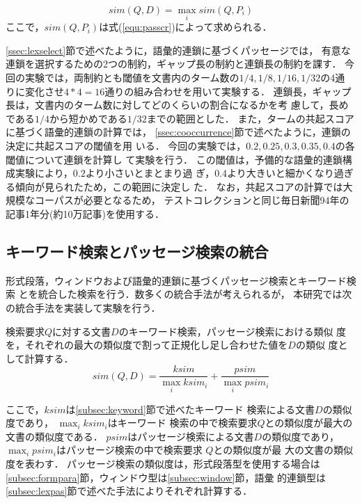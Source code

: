 \begin{equation}\label{equ:maxpas}
sim(Q,D)=\max_{i}sim(Q,P_{i})
\end{equation}
\noindent ここで，$sim(Q,P_{i})$は式(\ref{equ:passcr})によって求められる．

\ref{ssec:lexselect}節で述べたように，語彙的連鎖に基づくパッセージでは，
有意な連鎖を選択するための2つの制約，ギャップ長の制約と連鎖長の制約を課す．
今回の実験では，両制約とも閾値を文書内のターム数の$1/4,1/8,1/16,1/32$の4通
りに変化させ$4*4=16$通りの組み合わせを用いて実験する．
連鎖長，ギャップ長は，文書内のターム数に対してどのくらいの割合になるかを考
慮して，長めである$1/4$から短かめである$1/32$までの範囲とした．
また，タームの共起スコアに基づく語彙的連鎖の計算では，
\ref{ssec:cooccurrence}節で述べたように，連鎖の決定に共起スコアの閾値を用
いる．
今回の実験では，$0.2,0.25,0.3,0.35,0.4$の各閾値について連鎖を計算し
て実験を行う．
この閾値は，予備的な語彙的連鎖構成実験により，$0.2$より小さいとまとまり過
ぎ，$0.4$より大きいと細かくなり過ぎる傾向が見られたため，この範囲に決定し
た．
なお，共起スコアの計算では大規模なコーパスが必要となるため，
テストコレクションと同じ毎日新聞94年の記事1年分(約10万記事)を使用する．

\subsection{キーワード検索とパッセージ検索の統合}
形式段落，ウィンドウおよび語彙的連鎖に基づくパッセージ検索とキーワード検索
とを統合した検索を行う．数多くの統合手法が考えられるが，
本研究では次の統合手法を実装して実験を行う．

検索要求$Q$に対する文書$D$のキーワード検索，パッセージ検索における類似
度を，それぞれの最大の類似度で割って正規化し足し合わせた値を$D$の類似
度として計算する．
	\begin{equation}
	sim(Q,D) =
	\frac{ksim}{\displaystyle{\max_{i}ksim_{i}}} + 
	\frac{psim}{\displaystyle{\max_{i}psim_{i}}}
	\end{equation}
	
\noindent ここで，$ksim$は\ref{subsec:keyword}節で述べたキーワード
	検索による文書$D$の類似度であり，
	$\displaystyle{\max_{i}ksim_{i}}$はキーワード
	検索の中で検索要求$Q$との類似度が最大の文書の類似度である．
	$psim$はパッセージ検索による文書$D$の類似度であり，
	$\displaystyle{\max_{i} psim_{i}}$はパッセージ検索の中で検索要求
	$Q$との類似度が最
	大の文書の類似度を表わす．
	パッセージ検索の類似度は，形式段落型を使用する場合は
	\ref{subsec:formpara}節，ウィンドウ型は\ref{subsec:window}節，語彙
	的連鎖型は\ref{subsec:lexpas}節で述べた手法によりそれぞれ計算する．

